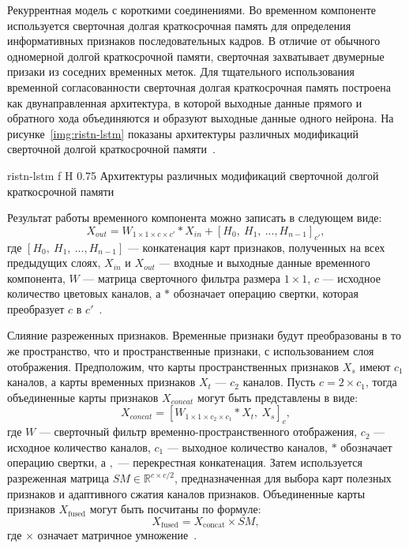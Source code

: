 \documentclass{bmstu}
\begin{document}
Рекуррентная модель с короткими соединениями. 
Во временном компоненте используется сверточная долгая краткосрочная память для определения информативных признаков последовательных кадров. 
В отличие от обычного одномерной долгой краткосрочной памяти, сверточная захватывает двумерные призаки из соседних временных меток. 
Для тщательного использования временной согласованности сверточная долгая краткосрочная память построена как двунаправленная архитектура, в которой выходные данные прямого и обратного хода объединяются и образуют выходные данные одного нейрона. 
На рисунке~\ref{img:ristn-lstm} показаны архитектуры различных модификаций сверточной долгой краткосрочной памяти~\cite{Xiaobin2019}.

    {ristn-lstm}
    {f}
    {H}
    {0.75\textwidth}
    {Архитектуры различных модификаций сверточной долгой краткосрочной памяти~\cite{Xiaobin2019}}
    
Результат работы временного компонента можно записать в следующем виде:
\begin{equation}
X_{out} = W_{1 \times 1 \times c \times c'} * X_{in} + [H_0,~H_1,~...,H_{n - 1}]_{c'},
\end{equation}
где $[H_0,~H_1,~...,H_{n - 1}]$ --- конкатенация карт признаков, полученных на всех предыдущих слоях, $X_{in}$ и $X_{out}$ --- входные и выходные данные временного компонента, $W$ --- матрица сверточного фильтра размера $1 \times 1$, $c$ --- исходное количество цветовых каналов, а $*$ обозначает операцию свертки, которая преобразует $c$ в $c'$~\cite{Xiaobin2019}.

Слияние разреженных признаков. 
Временные признаки будут преобразованы в то же пространство, что и пространственные признаки, с использованием слоя отображения. 
Предположим, что карты пространственных признаков $X_s$ имеют $c_1$ каналов, а карты временных признаков $X_t$ --- $c_2$ каналов. 
Пусть $c = 2 \times c_1$, тогда объединенные карты признаков $X_{concat}$ могут быть представлены в виде:
\begin{equation}
X_{concat} = [W_{1 \times 1 \times c_2 \times c_1} * X_t,~X_s]_{c},
\end{equation}
где $W$ --- сверточный фильтр временно-пространственного отображения, $c_2$ --- исходное количество каналов, $c_1$ --- выходное количество каналов, $*$ обозначает операцию свертки, а $,$ --- перекрестная конкатенация. 
Затем используется разреженная матрица $SM \in \mathbb{R}^{c \times c/2}$, предназначенная для выбора карт полезных признаков и адаптивного сжатия каналов признаков. 
Объединенные карты признаков $X_{\text{fused}}$ могут быть посчитаны по формуле:
\begin{equation}
X_{\text{fused}} = X_{\text{concat}} \times SM,
\end{equation}
где $\times$ означает матричное умножение~\cite{Xiaobin2019}. 
\end{document}
